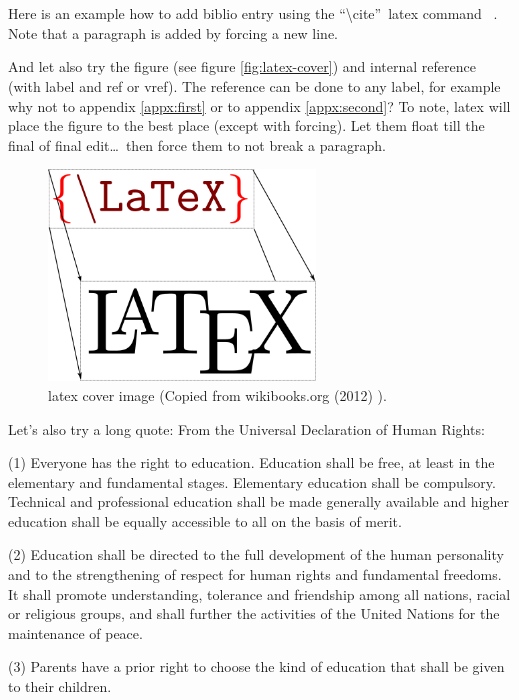 \documentclass[11pt,a4paper,oneside,article]{memoir}
\renewenvironment{quote}
  {\list{}{\rightmargin=0pt\leftmargin=1cm\topsep=-10pt}%
  \item\relax\fontsize{10pt}{10pt}\singlespacing}
  {\endlist}
\begin{document}
\section{}
Here is an example how to add biblio entry \cite{kopka:guide} using the \textquotedblleft\textbackslash{}cite\textquotedblright ~\gls{latex} command ~\cite[section 4.2]{tobias:book}. Note that a paragraph is added by forcing a new line.

And let also try the figure (see figure \vref{fig:latex-cover}) and internal reference (with label and ref or vref). The reference can be done to any label, for example why not to appendix \ref{appx:first} or to appendix \ref{appx:second}? To note, \gls{latex} will place the figure to the best place (except with forcing). Let them float till the final of final edit\ldots ~then force them to not break a paragraph.%
\begin{figure}[h]
  \centering
  \includegraphics[width=7.1cm]{LaTeX_cover}
  \caption{\gls{latex} cover image (Copied from wikibooks.org (2012) \cite{wikibooks:latex}).}
  \label{fig:latex-cover}
\end{figure}

Let's also try a long quote:
From the Universal Declaration of Human Rights:
\begin{quote}
(1) Everyone has the right to education. Education shall be free, at least in the elementary and fundamental stages. Elementary education shall be compulsory. Technical and professional education shall be made generally available and higher education shall be equally accessible to all on the basis of merit.

(2) Education shall be directed to the full development of the human personality and to the strengthening of respect for human rights and fundamental freedoms. It shall promote understanding, tolerance and friendship among all nations, racial or religious groups, and shall further the activities of the United Nations for the maintenance of peace.

(3) Parents have a prior right to choose the kind of education that shall be given to their children. \cite[article 26]{un:udhr}
\end{quote}
\end{document}
